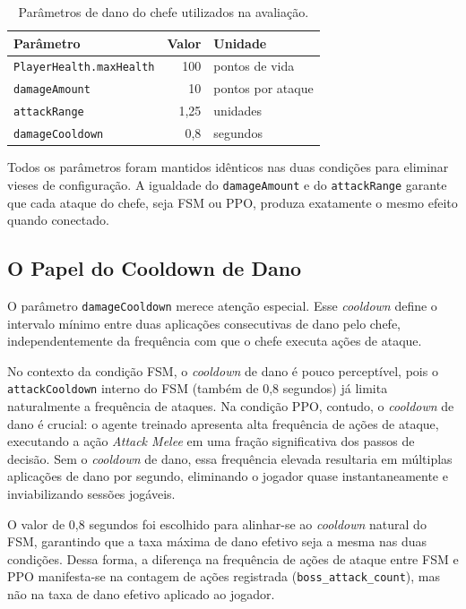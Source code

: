 \begin{table}[htb]
    \centering
    \caption{Parâmetros de dano do chefe utilizados na avaliação.}
    \label{tab:parametros-dano}
    \begin{tabular}{l r l}
        \toprule
        \textbf{Parâmetro}                 & \textbf{Valor} & \textbf{Unidade} \\
        \midrule
        \texttt{PlayerHealth.maxHealth}    & 100   & pontos de vida \\
        \texttt{damageAmount}              & 10    & pontos por ataque \\
        \texttt{attackRange}               & 1,25  & unidades \\
        \texttt{damageCooldown}            & 0,8   & segundos \\
        \bottomrule
    \end{tabular}
\end{table}

Todos os parâmetros foram mantidos idênticos nas duas condições para
eliminar vieses de configuração. A igualdade do \texttt{damageAmount} e do
\texttt{attackRange} garante que cada ataque do chefe, seja FSM ou PPO,
produza exatamente o mesmo efeito quando conectado.

\subsection{O Papel do Cooldown de Dano}
\label{subsec:cooldown-dano}

O parâmetro \texttt{damageCooldown} merece atenção especial. Esse
\textit{cooldown} define o intervalo mínimo entre duas aplicações consecutivas
de dano pelo chefe, independentemente da frequência com que o chefe executa
ações de ataque.

No contexto da condição FSM, o \textit{cooldown} de dano é pouco perceptível,
pois o \texttt{attackCooldown} interno do FSM (também de 0,8 segundos) já
limita naturalmente a frequência de ataques. Na condição PPO, contudo, o
\textit{cooldown} de dano é crucial: o agente treinado apresenta alta
frequência de ações de ataque, executando a ação \textit{Attack Melee} em
uma fração significativa dos passos de decisão. Sem o \textit{cooldown} de
dano, essa frequência elevada resultaria em múltiplas aplicações de dano
por segundo, eliminando o jogador quase instantaneamente e inviabilizando
sessões jogáveis.

O valor de 0,8 segundos foi escolhido para alinhar-se ao \textit{cooldown}
natural do FSM, garantindo que a taxa máxima de dano efetivo seja a mesma nas
duas condições. Dessa forma, a diferença na frequência de ações de ataque
entre FSM e PPO manifesta-se na contagem de ações registrada (\texttt{boss\_attack\_count}),
mas não na taxa de dano efetivo aplicado ao jogador.

